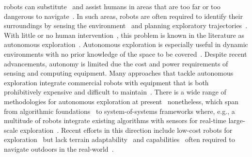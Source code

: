 \documentclass[lettersize,journal]{IEEEtran}
\theoremstyle{definition}
\begin{document}
 robots can %
substitute~\cite{rubio2019review} and %
assist humans in %
areas that are too far or too dangerous to navigate~\cite{takahiro2022legged,roucek2020darpa,tabib2022autonomous,ebadi2020lamp}. In %
such areas, robots are often required to identify their surroundings by sensing the environment~\cite{mei2006energy} and planning %
exploratory trajectories~\cite{shrestha2019learned,eldemiry2022autonomous}. With little or no human intervention~\cite{alatise2020review}, this problem is known in the literature as autonomous exploration~\cite{shrestha2019learned}. 
Autonomous exploration is especially useful in dynamic environments with no prior knowledge of the space to be covered~\cite{bircher2016receding,rubio2019review}.
Despite recent advancements, autonomy is limited %
due the cost and power requirements of sensing and computing equipment. %
Many approaches that tackle autonomous exploration 
integrate commercial robots with %
equipment that is both prohibitively expensive and difficult to maintain~\cite{lluvia2021active,placed2022survey,muller2021openbot,tabib2022autonomous,tardioli2019ground,ebadi2020lamp,dang2019graph,surmann2003autonomous}. 
There is a wide range of methodologies for autonomous exploration at present~\cite{placed2022survey,julia2012comparison} nonetheless, which span from algorithmic foundations~\cite{yamauchi1997frontier,placed2022survey,dang2019graph} to system-of-systems frameworks where, e.g., a multitude of robots integrate existing algorithms with sensors for real-time large-scale exploration~\cite{tranzatto2022cerberus,roucek2020darpa,tardioli2019ground,tabib2022autonomous,ebadi2020lamp}. 
Recent efforts in this direction include low-cost robots for exploration~\cite{muller2021openbot, zhou2021smartphone,faisal2021low} but lack terrain adaptability~\cite{muller2021openbot} and %
capabilities~\cite{zhou2021smartphone,faisal2021low} often required to navigate outdoors in the real-world~\cite{rubio2019review,kulkarni2022autonomous}.
\end{document}

